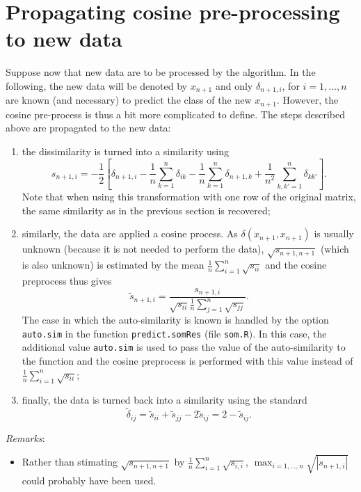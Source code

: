 \documentclass[a4paper,10pt]{scrartcl}
\begin{document}
\section{Propagating cosine pre-processing to new data}

Suppose now that new data are to be processed by the algorithm. In the
following, the new data will be denoted by $x_{n+1}$ and only $\delta_{n+1,i}$,
for $i=1,\ldots,n$ are known (and necessary) to predict the class of the new
$x_{n+1}$. However, the cosine pre-process is thus a bit more complicated to
define. The steps described above are propagated to the new data:
\begin{enumerate}
	\item the dissimilarity is turned into a similarity using
	\[
		s_{n+1,i} = -\frac{1}{2} \left[\delta_{n+1,i} -\frac{1}{n} \sum_{k=1}^n
\delta_{ik} - \frac{1}{n} \sum_{k=1}^n \delta_{n+1,k} + \frac{1}{n^2}
\sum_{k,k'=1}^n \delta_{kk'}\right].
	\]
	Note that when using this transformation with one row of the original matrix,
the same similarity as in the previous section is recovered;
	\item similarly, the data are applied a cosine process. As
$\delta(x_{n+1},x_{n+1})$ is usually unknown (because it is not needed to
perform the data), $\sqrt{s_{n+1,n+1}}$ (which is also unknown) is estimated by
the mean $\frac{1}{n}\sum_{i=1}^n \sqrt{s_{ii}}$ and the cosine preprocess thus
gives
	\[
		\tilde{s}_{n+1,i} = \frac{s_{n+1,i}}{\sqrt{s_{ii}}\frac{1}{n}\sum_{j=1}^n
\sqrt{s_{jj}}}.
	\]
	The case in which the auto-similarity is known is handled by the option
\verb+auto.sim+ in the function \verb+predict.somRes+ (file \verb+som.R+). In
this case, the additional value \verb+auto.sim+ is used to pass the value of the
auto-similarity to the function and the cosine preprocess is performed with this
value instead of $\frac{1}{n}\sum_{i=1}^n \sqrt{s_{ii}}$;
	\item finally, the data is turned back into a similarity using the standard
	\[
		\tilde{\delta}_{ij} = \tilde{s}_{ii} + \tilde{s}_{jj} - 2\tilde{s}_{ij} =
2-\tilde{s}_{ij}.
	\]
\end{enumerate}

\emph{Remarks}:
\begin{itemize}
	\item Rather than stimating $\sqrt{s_{n+1,n+1}}$ by $\frac{1}{n}\sum_{i=1}^n
\sqrt{s_{i,i}}$, $\max_{i=1,\ldots,n} \sqrt{|s_{n+1,i}|}$ could probably have
been used.
\end{itemize}
\end{document}
